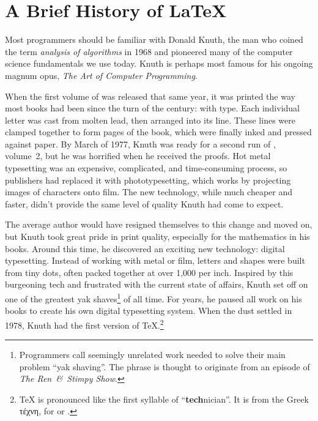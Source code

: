\chapter{A Brief History of \texorpdfstring{\LaTeX}{LaTeX}}
\label{history}

Most programmers should be familiar with Donald Knuth,
the man who coined the term \emph{analysis of algorithms} in 1968
and pioneered many of the computer science fundamentals we use today.
Knuth is perhaps most famous for his ongoing magnum opus,
\textit{The Art of Computer Programming}.

When the first volume of  was released that same year,
it was printed the way most books had been since the turn of the century:
with  type.
Each individual letter was cast from molten lead,
then arranged into its line.
These lines were clamped together to form pages of the book,
which were finally inked and pressed against paper.
By March of 1977, Knuth was ready for a second run of , volume~2,
but he was horrified when he received the proofs.
Hot metal typesetting was an expensive, complicated, and time-consuming process,
so publishers had replaced it with phototypesetting,
which works by projecting images of characters onto film.
The new technology, while much cheaper and faster,
didn't provide the same level of quality Knuth had come to
expect.\punckern{}

The average author would have resigned themselves to this change and moved on,
but Knuth took great pride in print quality,
especially for the mathematics in his books.
Around this time, he discovered an exciting new technology:
digital typesetting.
Instead of working with metal or film,
letters and shapes were built from tiny dots,
often packed together at over 1,000 per inch.
Inspired by this burgeoning tech and frustrated with the current state of affairs,
Knuth set off on one of the greatest yak shaves\footnote{Programmers
call seemingly unrelated work needed to solve their main problem
``yak shaving''\quotekern. The phrase is thought to originate from an episode
of \textit{The Ren~\&~Stimpy Show}.\punckern{}}
of all time.
For years, he paused all work on his books to create his own
digital typesetting system.
When the dust settled in 1978, Knuth had the first version of
\TeX.\punckern\footnote{\TeX{} is pronounced like the first syllable of
``\textbf{tech}nician''\quotekern. It is from the Greek
{τέχνη},
for  or .\punckern{}}

